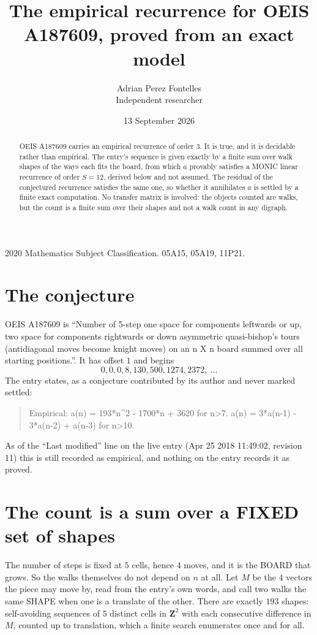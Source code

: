 \documentclass[11pt,a4paper]{article}
\title{The empirical recurrence for OEIS A187609, proved from an exact model}
\author{Adrian Perez Fontelles\\ \small Independent researcher}
\date{13 September 2026}
\theoremstyle{plain}
\theoremstyle{definition}
\begin{document}
\maketitle

\begin{abstract}
OEIS A187609 carries an empirical recurrence of order $3$. It is true, and it is
decidable rather than empirical. The entry's sequence is given exactly by a finite sum over walk shapes of the ways each fits the board, from
which $a$ provably satisfies a MONIC linear recurrence of order $S=12$, derived below and not
assumed. The residual of the conjectured recurrence satisfies the same one, so whether it
annihilates $a$ is settled by a finite exact computation. No transfer matrix is involved: the objects counted are walks, but the count is a finite sum over their shapes and not a walk count in any digraph.
\end{abstract}

\noindent\small 2020 Mathematics Subject Classification. 05A15, 05A19, 11P21.\normalsize

\section{The conjecture}

OEIS A187609 is ``Number of 5-step one space for components leftwards or up, two space for components rightwards or down asymmetric quasi-bishop's tours (antidiagonal moves become knight moves) on an n X n board summed over all starting positions.''. It has offset $1$ and begins
\[
0, 0, 0, 8, 130, 500, 1274, 2372,\ \dots
\]
The entry states, as a conjecture contributed by its author and never marked settled:
\begin{quote}
Empirical: a(n) = 193*n\^{}2 - 1700*n + 3620 for n>7. a(n) = 3*a(n-1) - 3*a(n-2) + a(n-3) for n>10.
\end{quote}
As of the ``Last modified'' line on the live entry (Apr 25 2018 11:49:02, revision 11)
this is still recorded as empirical, and nothing on the entry records it as proved.

\section{The count is a sum over a FIXED set of shapes}

The number of steps is fixed at $5$ cells, hence $4$ moves, and it is the BOARD
that grows. So the walks themselves do not depend on $n$ at all. Let $M$ be the $4$
vectors the piece may move by, read from the entry's own words, and call two walks the same
SHAPE when one is a translate of the other. There are exactly $193$ shapes: self-avoiding
sequences of $5$ distinct cells in $\mathbf{Z}^{2}$ with each consecutive difference in
$M$, counted up to translation, which a finite search enumerates once and for all.
\end{document}
